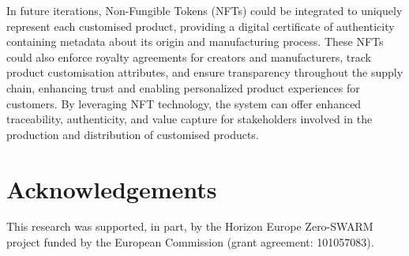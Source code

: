 \begin{bibunit}
In future iterations, Non-Fungible Tokens (NFTs) could be integrated to uniquely represent each customised product, providing a digital certificate of authenticity containing metadata about its origin and manufacturing process. These NFTs could also enforce royalty agreements for creators and manufacturers, track product customisation attributes, and ensure transparency throughout the supply chain, enhancing trust and enabling personalized product experiences for customers. By leveraging NFT technology, the system can offer enhanced traceability, authenticity, and value capture for stakeholders involved in the production and distribution of customised products.


\section{Acknowledgements}
This research was supported, in part, by the Horizon Europe Zero-SWARM project funded by the European Commission (grant agreement: 101057083).

\clearpage
\putbib
\end{bibunit} 